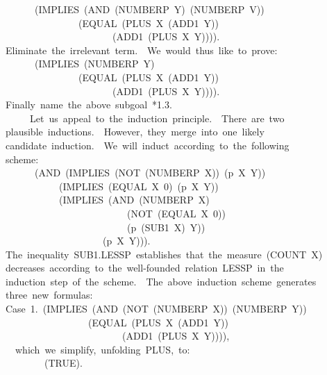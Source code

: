 \documentclass[11pt]{book}
\newenvironment{pubasis}{\begin{flushleft}\ttfamily\small}{\normalsize\rmfamily\end{flushleft}}
\begin{document}
\begin{pubasis}
~~~~~~~~(IMPLIES~(AND~(NUMBERP~Y)~(NUMBERP~V))\\
~~~~~~~~~~~~~~~~~(EQUAL~(PLUS~X~(ADD1~Y))\\
~~~~~~~~~~~~~~~~~~~~~~~~(ADD1~(PLUS~X~Y)))).\\

~~Eliminate~the~irrelevant~term.~~We~would~thus~like~to~prove:\\

~~~~~~~~(IMPLIES~(NUMBERP~Y)\\
~~~~~~~~~~~~~~~~~(EQUAL~(PLUS~X~(ADD1~Y))\\
~~~~~~~~~~~~~~~~~~~~~~~~(ADD1~(PLUS~X~Y)))).\\

~~Finally~name~the~above~subgoal~*1.3.\\

~~~~~~~Let~us~appeal~to~the~induction~principle.~~There~are~two\\
~~plausible~inductions.~~However,~they~merge~into~one~likely\\
~~candidate~induction.~~We~will~induct~according~to~the~following\\
~~scheme:\\
~~~~~~~~(AND~(IMPLIES~(NOT~(NUMBERP~X))~(p~X~Y))\\
~~~~~~~~~~~~~(IMPLIES~(EQUAL~X~0)~(p~X~Y))\\
~~~~~~~~~~~~~(IMPLIES~(AND~(NUMBERP~X)\\
~~~~~~~~~~~~~~~~~~~~~~~~~~~(NOT~(EQUAL~X~0))\\
~~~~~~~~~~~~~~~~~~~~~~~~~~~(p~(SUB1~X)~Y))\\
~~~~~~~~~~~~~~~~~~~~~~(p~X~Y))).\\
~~The~inequality~SUB1.LESSP~establishes~that~the~measure~(COUNT~X)\\
~~decreases~according~to~the~well-founded~relation~LESSP~in~the\\
~~induction~step~of~the~scheme.~~The~above~induction~scheme~generates\\
~~three~new~formulas:\\

~~Case~1.~(IMPLIES~(AND~(NOT~(NUMBERP~X))~(NUMBERP~Y))\\
~~~~~~~~~~~~~~~~~~~(EQUAL~(PLUS~X~(ADD1~Y))\\
~~~~~~~~~~~~~~~~~~~~~~~~~~(ADD1~(PLUS~X~Y)))),\\

~~~~which~we~simplify,~unfolding~PLUS,~to:\\

~~~~~~~~~~(TRUE).\\


\end{pubasis}
\end{document}
